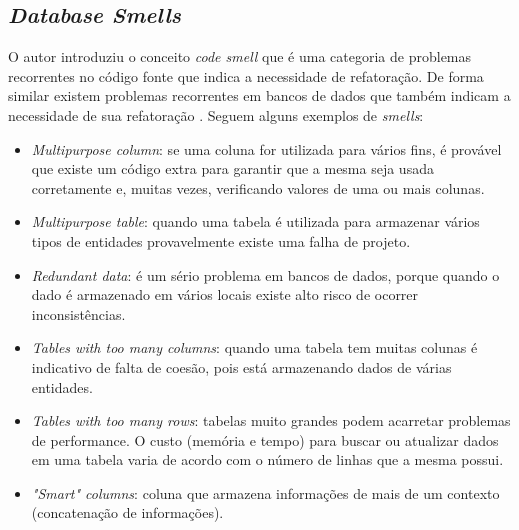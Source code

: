 \documentclass[10pt]{article}
\begin{document}
\subsection{\textit{Database Smells}}
	O autor \cite{Fowler:Refatoracao} introduziu o conceito \textit{code smell} que é uma categoria de problemas recorrentes no código fonte que indica a necessidade de refatoração. De forma similar existem problemas recorrentes em bancos de dados que também indicam a necessidade de sua refatoração \cite{Ambler:RefactoringDatabases}. Seguem alguns exemplos de \textit{smells}:
	\begin{itemize}
		\item \textit{Multipurpose column}: se uma coluna for utilizada para vários fins, é provável que existe um código extra para garantir que a mesma seja usada corretamente e, muitas vezes, verificando valores de uma ou mais colunas.
		\item \textit{Multipurpose table}: quando uma tabela é utilizada para armazenar vários tipos de entidades provavelmente existe uma falha de projeto.
		\item \textit{Redundant data}: é um sério problema em bancos de dados, porque quando o dado é armazenado em vários locais existe alto risco de ocorrer inconsistências.
		\item \textit{Tables with too many columns}: quando uma tabela tem muitas colunas é indicativo de falta de coesão, pois está armazenando dados de várias entidades.
		\item \textit{Tables with too many rows}: tabelas muito grandes podem acarretar problemas de performance. O custo (memória e tempo) para buscar ou atualizar dados em uma tabela varia de acordo com o número de linhas que a mesma possui.
		\item \textit{"Smart" columns}: coluna que armazena informações de mais de um contexto (concatenação de informações).
	\end{itemize}




\end{document}
